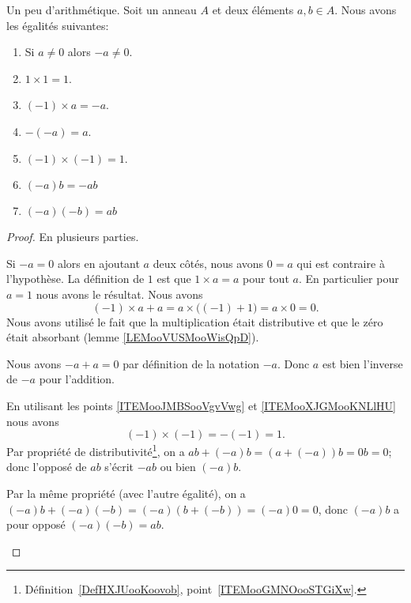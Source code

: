 \begin{lemma}        \label{LEMooLTERooVKgqjn}
	Un peu d'arithmétique. Soit un anneau \( A\) et deux éléments \( a, b \in A\). Nous avons les égalités suivantes:
	\begin{enumerate}
		\item	    \label{ITEMooWNPVooFeMQAp}
		      Si \( a\neq 0\) alors \( -a\neq 0\).
		\item       \label{ITEMooUGHCooOPgoeR}
		      \( 1\times 1=1\).
		\item       \label{ITEMooJMBSooVgvVwg}
		      \( (-1)\times a=-a\).
		\item       \label{ITEMooXJGMooKNLlHU}
		      \( -(-a)=a\).
		\item       \label{ITEMooYMRKooHVYYKU}
		      \((-1)\times (-1)=1\).
		\item	    \label{ITEMooAnneauArith5}
		      \( (-a)b=-ab\)
		\item	    \label{ITEMooHUJFooKkylVt}
		      \( (-a)(-b)=ab\)
	\end{enumerate}
\end{lemma}

\begin{proof}
	En plusieurs parties.
	\begin{subproof}
		Si \( -a=0\) alors en ajoutant \( a\) deux côtés, nous avons \( 0=a\) qui est contraire à l'hypothèse.
		La définition de \( 1\) est que \( 1\times a=a\) pour tout \( a\). En particulier pour \( a=1\) nous avons le résultat.
		Nous avons
		\begin{equation}
			(-1)\times a + a= a\times \big( (-1)+1 \big)=a\times 0=0.
		\end{equation}
		Nous avons utilisé le fait que la multiplication était distributive et que le zéro était absorbant (lemme \ref{LEMooVUSMooWisQpD}).

		Nous avons \( -a+a=0\) par définition de la notation \( -a\). Donc \( a\) est bien l'inverse de \( -a\) pour l'addition.

		En utilisant les points \ref{ITEMooJMBSooVgvVwg} et \ref{ITEMooXJGMooKNLlHU} nous avons
		\begin{equation}
			(-1)\times (-1)=-(-1)=1.
		\end{equation}
		Par propriété de distributivité\footnote{Définition~\ref{DefHXJUooKoovob}, point~\ref{ITEMooGMNOooSTGiXw}.}, on a \( ab + (-a)b  = (a+(-a))b = 0b = 0 \); donc l'opposé de \( ab \) s'écrit \( -ab \) ou bien \( (-a)b \).

		Par la même propriété (avec l'autre égalité), on a \( (-a) b + (-a)(-b) = (-a)(b+(-b)) = (-a) 0 = 0 \), donc \( (-a) b \) a pour opposé \( (-a)(-b)=ab\).
	\end{subproof}
\end{proof}

